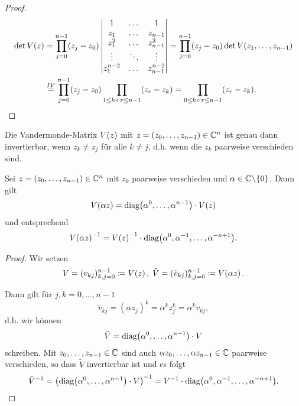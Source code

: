 \begin{proof}
    \[
        \begin{split}
            \det{V \! \left( z \right)}
            &= \prod_{j=0}^{n-1} (z_j - z_0) \begin{vmatrix}
                1         & \dots & 1 \\
                z_1       & \dots & z_{n-1} \\
                z_1^2     & \dots & z_{n-1}^2 \\
                \vdots    & \ddots & \vdots \\
                z_1^{n-2} & \dots & z_{n-1}^{n-2}
            \end{vmatrix}
            = \prod_{j=0}^{n-1} (z_j - z_0) \det{V \! \left( z_1, \dots, z_{n-1} \right)}\\
            &\overset{IV}{=} \prod_{j=0}^{n-1} (z_j - z_0) \prod_{1 \leq k < r \leq n-1} (z_r - z_k)
            = \prod_{0 \leq k < r \leq n-1} (z_r - z_k).
        \end{split}
    \]
\end{proof}

\begin{corollary}
    Die Vandermonde-Matrix $V \! \left( z \right)$ mit
    $z = (z_0, \dots, z_{n-1}) \in \mathbb{C}^n$ ist genau dann invertierbar, wenn
    $z_k \neq z_j$ für alle $k \neq j$, d.h. wenn die $z_k$ paarweise
    verschieden sind.
\end{corollary}

\begin{lemma}
    \label{lemma:vandermonde_const_multiplication}
    Sei $z = (z_0, \dots, z_{n-1}) \in \mathbb{C}^n$ mit $z_k$ paarweise verschieden und
    $\alpha \in \mathbb{C} \! \setminus \! \{0\}$.
    Dann gilt
    \begin{equation}
        \label{eq:vandermonde_const_multiplication}
        V \! \left( \alpha z \right)
        = \text{diag$ \left( \alpha^0, \dots, \alpha^{n-1} \right)$} \cdot V \! \left( z \right)
    \end{equation}
    und entsprechend
    \begin{equation}
        \label{eq:inverse_vandermonde_const_multiplication}
        V \! \left( \alpha z \right)^{-1}
        = V \! \left( z \right)^{-1} \cdot \text{diag$ \left( \alpha^0, \alpha^{-1}, \dots, \alpha^{-n+1} \right)$}.
    \end{equation}
\end{lemma}
\begin{proof}
    Wir setzen
    \[
        V = (v_{kj})_{k,j=0}^{n-1} \coloneqq V \! \left( z \right), \;
        \tilde{V} = (\tilde{v}_{kj})_{k,j=0}^{n-1} \coloneqq V \! \left( \alpha z \right).
    \]

    \noindent Dann gilt für $j,k = 0,\dots,n-1$
    \[
        \tilde{v}_{kj} = (\alpha z_j)^k = \alpha^k z_j^k = \alpha^k v_{kj},
    \]
    d.h. wir können
    \[
        \tilde{V} = \text{diag$ \left( \alpha^0, \dots, \alpha^{n-1} \right)$} \cdot V
    \]
    schreiben.
    Mit $z_0, \dots, z_{n-1} \in \mathbb{C}$ sind auch
    $\alpha z_0, \dots, \alpha z_{n-1} \in \mathbb{C}$
    paarweise verschieden, so dass $\tilde{V}$ invertierbar ist und es folgt
    \[
        \tilde{V}^{-1}
        = \left( \text{diag$ \left( \alpha^0, \dots, \alpha^{n-1} \right)$} \cdot V \right)^{-1}
        = V^{-1} \cdot \text{diag$ \left( \alpha^0, \alpha^{-1}, \dots, \alpha^{-n+1} \right)$}.
    \]
\end{proof}

